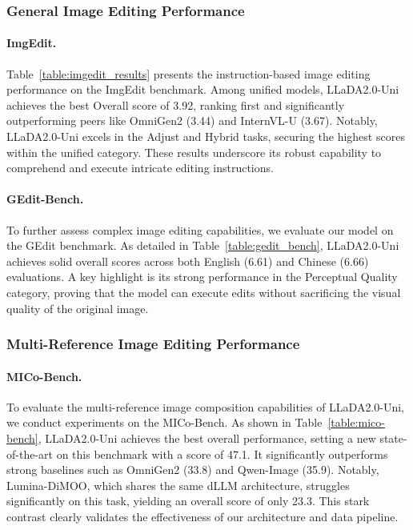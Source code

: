 \subsubsection{General Image Editing Performance}
\paragraph{ImgEdit.} Table~\ref{table:imgedit_results} presents the instruction-based image editing performance on the ImgEdit benchmark.
%
Among unified models, LLaDA2.0-Uni achieves the best Overall score of 3.92, ranking first and significantly outperforming peers like OmniGen2 (3.44) and InternVL-U (3.67).
%
Notably, LLaDA2.0-Uni excels in the Adjust and Hybrid tasks, securing the highest scores within the unified category. 
%
These results underscore its robust capability to comprehend and execute intricate editing instructions.

\paragraph{GEdit-Bench.} 
To further assess complex image editing capabilities, we evaluate our model on the GEdit benchmark.
%
As detailed in Table~\ref{table:gedit_bench}, LLaDA2.0-Uni achieves solid overall scores across both English (6.61) and Chinese (6.66) evaluations.
%
A key highlight is its strong performance in the Perceptual Quality category, proving that the model can execute edits without sacrificing the visual quality of the original image.


\subsubsection{Multi-Reference Image Editing Performance}
\paragraph{MICo-Bench.} 
To evaluate the multi-reference image composition capabilities of LLaDA2.0-Uni, we conduct experiments on the MICo-Bench.
%
As shown in Table~\ref{table:mico-bench}, LLaDA2.0-Uni achieves the best overall performance, setting a new state-of-the-art on this benchmark with a score of 47.1.
%
It significantly outperforms strong baselines such as OmniGen2 (33.8) and Qwen-Image (35.9).
%
Notably, Lumina-DiMOO, which shares the same dLLM architecture, struggles significantly on this task, yielding an overall score of only 23.3.
%
This stark contrast clearly validates the effectiveness of our architecture and data pipeline.


